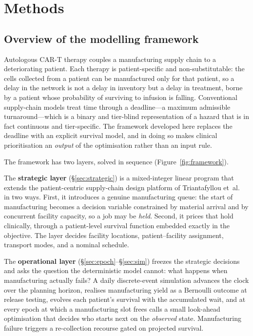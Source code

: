 \section{Methods}
\label{sec:methods}

\subsection{Overview of the modelling framework}
\label{sec:overview}

Autologous CAR-T therapy couples a manufacturing supply chain to a
deteriorating patient. Each therapy is patient-specific and
non-substitutable: the cells collected from a patient can be manufactured
only for that patient, so a delay in the network is not a delay in inventory
but a delay in treatment, borne by a patient whose probability of surviving to
infusion is falling. Conventional supply-chain models treat time through a
deadline---a maximum admissible turnaround---which is a binary and tier-blind
representation of a hazard that is in fact continuous and tier-specific. The
framework developed here replaces the deadline with an explicit survival
model, and in doing so makes clinical prioritisation an \emph{output} of the
optimisation rather than an input rule.

The framework has two layers, solved in sequence (Figure~\ref{fig:framework}).

The \textbf{strategic layer} (\S\ref{sec:strategic}) is a mixed-integer linear
program that extends the patient-centric supply-chain design platform of
Triantafyllou et~al.\ \cite{triantafyllou2022} in two ways. First, it
introduces a genuine manufacturing
queue: the start of manufacturing becomes a decision variable constrained by
material arrival and by concurrent facility capacity, so a job may be
\emph{held}. Second, it prices that hold clinically, through a patient-level
survival function embedded exactly in the objective. The layer decides
facility locations, patient--facility assignment, transport modes, and a
nominal schedule.

The \textbf{operational layer} (\S\ref{sec:epoch}--\S\ref{sec:sim}) freezes the
strategic decisions and asks the question the deterministic model cannot: what
happens when manufacturing actually fails? A daily discrete-event simulation
advances the clock over the planning horizon, realises manufacturing yield as
a Bernoulli outcome at release testing, evolves each patient's survival with
the accumulated wait, and at every epoch at which a manufacturing slot frees
calls a small look-ahead optimisation that decides who starts next on the
\emph{observed} state. Manufacturing failure triggers a re-collection recourse
gated on projected survival.

